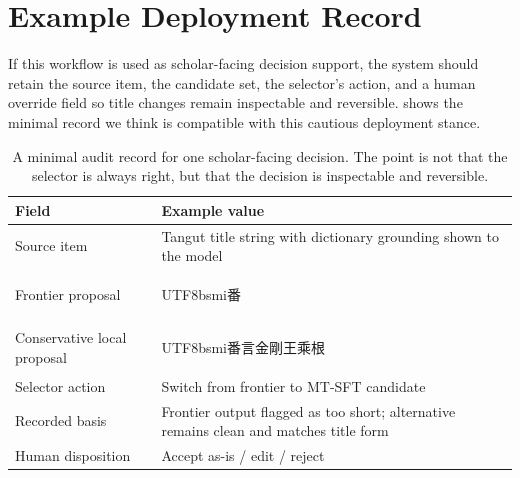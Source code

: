 \documentclass{article}
\newcommand{\zh}[1]{{\begin{CJK*}{UTF8}{bsmi}#1\end{CJK*}}}
\begin{document}
\section{Example Deployment Record}

If this workflow is used as scholar-facing decision support, the system should retain the source item, the candidate set, the selector's action, and a human override field so title changes remain inspectable and reversible.  shows the minimal record we think is compatible with this cautious deployment stance.

\begin{table}[H]
\centering
\small
\begin{tabularx}{\textwidth}{@{}l>{\raggedright\arraybackslash}X@{}}
\toprule
Field & Example value \\
\midrule
Source item & Tangut title string with dictionary grounding shown to the model \\
Frontier proposal & \zh{番} \\
Conservative local proposal & \zh{番言金剛王乘根} \\
Selector action & Switch from frontier to MT-SFT candidate \\
Recorded basis & Frontier output flagged as too short; alternative remains clean and matches title form \\
Human disposition & Accept as-is / edit / reject \\
\bottomrule
\end{tabularx}
\caption{A minimal audit record for one scholar-facing decision. The point is not that the selector is always right, but that the decision is inspectable and reversible.}
\label{tab:auditrecord}
\end{table}
\end{document}
